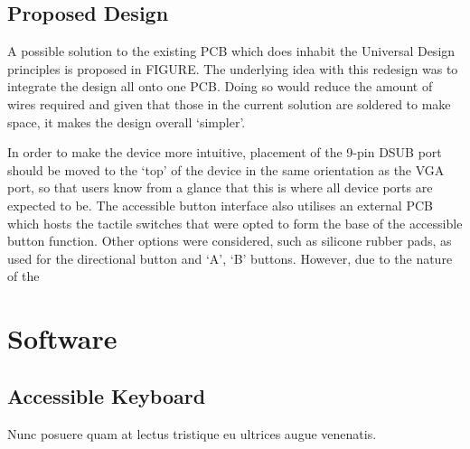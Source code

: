 \subsection{Proposed Design}

A possible solution to the existing PCB which does inhabit the Universal Design principles is proposed in FIGURE. 
The underlying idea with this redesign was to integrate the design all onto one PCB. Doing so would reduce the amount of wires required and given that those in the current solution are soldered to make space, it makes the design overall ‘simpler’.

In order to make the device more intuitive, placement of the 9-pin DSUB port should be moved to the ‘top’ of the device in the same orientation as the VGA port, so that users know from a glance that this is where all device ports are expected to be.
The accessible button interface also utilises an external PCB which hosts the tactile switches that were opted to form the base of the accessible button function. 
Other options were considered, such as silicone rubber pads, as used for the directional button and ‘A’, ‘B’ buttons. However, due to the nature of the



\section{Software}


\subsection{Accessible Keyboard}

Nunc posuere quam at lectus tristique eu ultrices augue venenatis.

